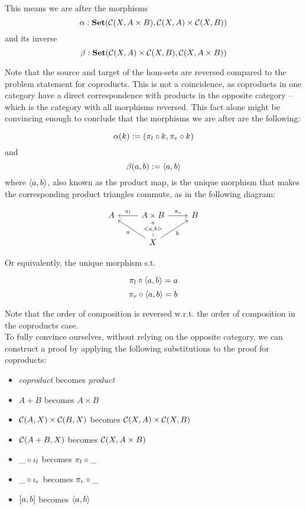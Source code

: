 \begin{solution}\label{sol:product-represent}
\newcommand{\CP}{\CC(A+B,X)}
\newcommand{\CQ}{\CC(A,X)\times\CC(B,X)}
\newcommand{\PP}{\CC(X,A\times B)}
\newcommand{\PQ}{\CC(X,A)\times\CC(X,B)}
  
This means we are after the morphisms \[\alpha:\SET(\PP, \PQ)\] and its inverse \[\beta:\SET(\PQ, \PP)\]

Note that the source and target of the hom-sets are reversed compared to the problem statement for coproducts. This is not a coincidence, as coproducts in one category have a direct correspondence with products in the opposite category -- which is the category with all morphisms reversed. This fact alone might be convincing enough to conclude that the morphisms we are after are the following:

\[\alpha(k):=(\pi_l \circ k, \pi_r \circ k)\] and \[\beta(a,b) := \langle a, b \rangle\] where $\langle a, b \rangle$, also known as the product map, is the unique morphism that makes the corresponding product triangles commute, as in the following diagram:

\[
\begin{tikzcd}
A & A\times B \arrow[r, "\pi_r"] \arrow[l, "\pi_l"']                    & B \\
  & X \arrow[u, "{<a,b>}" description] \arrow[ru, "b"'] \arrow[lu, "a"] &  
\end{tikzcd}
\]

Or equivalently, the unique morphism s.t. 

\begin{equation}
\label{ga2}
    \pi_l \circ \langle a, b \rangle = a
\end{equation}
\begin{equation}
\label{gb2}
    \pi_r \circ \langle a, b \rangle = b
\end{equation}

Note that the order of composition is reversed w.r.t. the order of composition in the coproducts case.\\

To fully convince ourselves, without relying on the opposite category, we can construct a proof by applying the following substitutions to the proof for coproducts:

\begin{itemize}
    \item \textit{coproduct} becomes \textit{product}
    \item $A+B$ becomes $A\times B$
    \item $\CQ$ becomes $\PQ$
    \item $\CP$ becomes $\PP$
    \item $\_ \circ \iota_l$ becomes $\pi_l \circ \_$
    \item $\_ \circ \iota_r$ becomes $\pi_r \circ \_$
    \item $[ a, b ]$ becomes $\langle a, b \rangle$
\end{itemize}
\end{solution}

